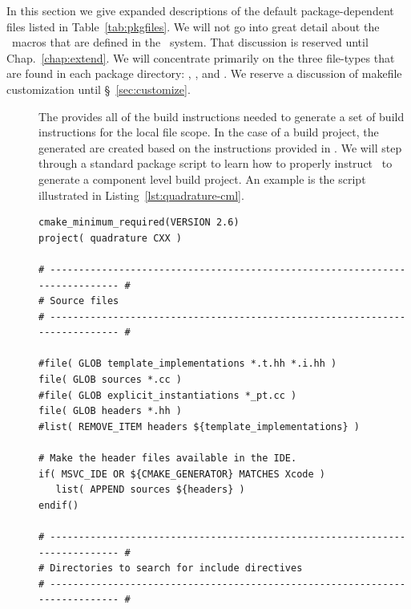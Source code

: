 In this section we give expanded descriptions of the default
package-dependent files listed in Table~\ref{tab:pkgfiles}.  We will
not go into great detail about the \cmake\ macros that are defined in the \draco\ system.  That discussion is
reserved until Chap.~\ref{chap:extend}.  We will concentrate primarily
on the three file-types that are found in each package directory:
, , and .  We reserve a discussion of makefile
customization until \S~\ref{sec:customize}.
\begin{description}
\item[] The
   provides all of the build instructions needed to generate a set of build instructions for the local file scope.  In the case of a  build project, the generated  are created based on the instructions provided in .  We will step through a standard package
   script to learn how to properly instruct \cmake\ to generate a component level build project.  An example is the  
   script illustrated in Listing~\ref{lst:quadrature-cml}.
    
\begin{lstlisting}[basicstyle=\footnotesize, xleftmargin=0.0in, xrightmargin=0.0in,caption={\comp{CMakeLists.txt} file for the \pkg{quadrature} package.},label=lst:quadrature-cml,float=htp]
cmake_minimum_required(VERSION 2.6)
project( quadrature CXX )

# ---------------------------------------------------------------------------- #
# Source files
# ---------------------------------------------------------------------------- #

#file( GLOB template_implementations *.t.hh *.i.hh )
file( GLOB sources *.cc )
#file( GLOB explicit_instantiations *_pt.cc )
file( GLOB headers *.hh )
#list( REMOVE_ITEM headers ${template_implementations} )

# Make the header files available in the IDE.
if( MSVC_IDE OR ${CMAKE_GENERATOR} MATCHES Xcode )
   list( APPEND sources ${headers} )
endif()

# ---------------------------------------------------------------------------- #
# Directories to search for include directives
# ---------------------------------------------------------------------------- #


\end{lstlisting}
\end{description}
